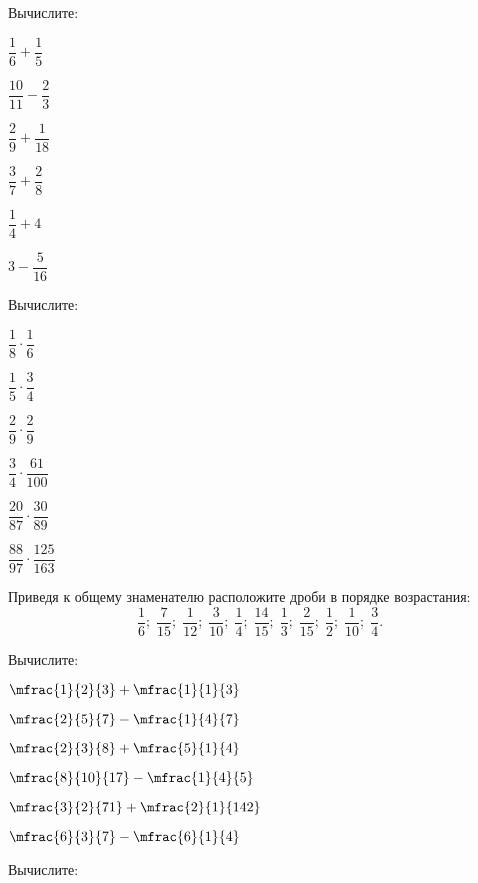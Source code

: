 \begin{homework}[number=2]
	\begin{listofex}
		\item Вычислите:
		\begin{enumcols}[columns=3]
			\item \( \dfrac{1}{6}+\dfrac{1}{5} \)
			\item \( \dfrac{10}{11}-\dfrac{2}{3} \)
			\item \( \dfrac{2}{9}+\dfrac{1}{18} \)
			\item \( \dfrac{3}{7}+\dfrac{2}{8} \)
			\item \( \dfrac{1}{4}+4 \)
			\item \( 3-\dfrac{5}{16} \)
		\end{enumcols}
		\item Вычислите:
		\begin{enumcols}[columns=3]
			\item \( \dfrac{1}{8}\cdot\dfrac{1}{6} \)
			\item \( \dfrac{1}{5}\cdot\dfrac{3}{4} \)
			\item \( \dfrac{2}{9}\cdot\dfrac{2}{9} \)
			\item \( \dfrac{3}{4}\cdot\dfrac{61}{100} \)
			\item \( \dfrac{20}{87}\cdot\dfrac{30}{89} \)
			\item \( \dfrac{88}{97}\cdot\dfrac{125}{163} \)
		\end{enumcols}
		\item Приведя к общему знаменателю расположите дроби в порядке возрастания:
		\[ \dfrac{1}{6};\;\dfrac{7}{15};\;\dfrac{1}{12};\;\dfrac{3}{10};\;\dfrac{1}{4};\;\dfrac{14}{15};\;\dfrac{1}{3};\;\dfrac{2}{15};\;\dfrac{1}{2};\;\dfrac{1}{10};\;\dfrac{3}{4}. \]
		\item Вычислите:
		\begin{enumcols}[columns=3]
			\item \(\mfrac{1}{2}{3}+\mfrac{1}{1}{3} \)
			\item \(\mfrac{2}{5}{7}-\mfrac{1}{4}{7} \)
			\item \( \mfrac{2}{3}{8}+\mfrac{5}{1}{4}\)
			\item \( \mfrac{8}{10}{17}-\mfrac{1}{4}{5}\)
			\item \( \mfrac{3}{2}{71}+\mfrac{2}{1}{142} \)
			\item \( \mfrac{6}{3}{7}-\mfrac{6}{1}{4}\)
		\end{enumcols}
		\item Вычислите:
		\begin{enumcols}[columns=3]

\end{enumcols}
\end{listofex}
\end{homework}
